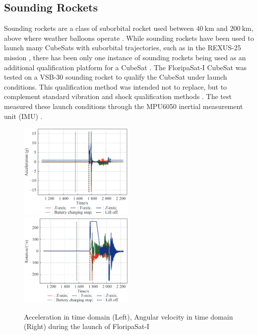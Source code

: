 \documentclass{report}
\begin{document}
\subsection{Sounding Rockets}
Sounding rockets are a class of suborbital rocket used between $\SI{40}{\kilo\metre}$ and $\SI{200}{\kilo\metre}$, above where weather balloons operate \cite{seibert2006history}. While sounding rockets have been used to launch many CubeSats with suborbital trajectories, such as in the REXUS-25 mission \cite{pont2019rexus}, there has been only one instance of sounding rockets being used as an additional qualification platform for a CubeSat \cite{slongo2019pre}. The FloripaSat-I CubeSat was tested on a VSB-30 sounding rocket \cite{slongo2019pre} to qualify the CubeSat under launch conditions. This qualification method was intended not to replace, but to complement standard vibration and shock qualification methods \cite{slongo2019pre}. The test measured these launch conditions through the MPU6050 inertial measurement unit (IMU) \cite{slongo2019pre}.

\begin{figure}[H]
  \includegraphics[width=0.495\textwidth]{images/floripa-accel.png}
  \includegraphics[width=0.495\textwidth]{images/floripa-rot.png}
  \caption{Acceleration in time domain (Left), Angular velocity in time domain (Right) during the launch of FloripaSat-I \cite{9316404}}
  \label{fig:accel-rot}
\end{figure}
\end{document}
